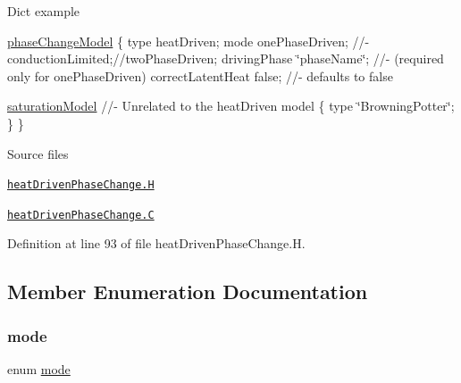 Dict example

\hyperlink{classFoam_1_1phaseChangeModel}{phase\+Change\+Model} \{ type heat\+Driven; mode one\+Phase\+Driven; //-\/ conduction\+Limited;//two\+Phase\+Driven; driving\+Phase \char`\"{}phase\+Name\char`\"{}; //-\/ (required only for one\+Phase\+Driven) correct\+Latent\+Heat false; //-\/ defaults to false

\hyperlink{classFoam_1_1saturationModel}{saturation\+Model} //-\/ Unrelated to the heat\+Driven model \{ type \char`\"{}\+Browning\+Potter\char`\"{}; \} \}

\begin{DoxyParagraph}{Source files}

\begin{DoxyItemize}
\item \href{../../../home/carlo/data/GeN-Foam/GeN-Foam_ffn/GeN-Foam/GeN-Foam/classes/thermalHydraulics/src/physicsModels/phaseChangeModels/heatDriven/heatDrivenPhaseChange.H}{\tt heat\+Driven\+Phase\+Change.\+H} 
\item \href{../../../home/carlo/data/GeN-Foam/GeN-Foam_ffn/GeN-Foam/GeN-Foam/classes/thermalHydraulics/src/physicsModels/phaseChangeModels/heatDriven/heatDrivenPhaseChange.C}{\tt heat\+Driven\+Phase\+Change.\+C} 
\end{DoxyItemize}
\end{DoxyParagraph}


Definition at line 93 of file heat\+Driven\+Phase\+Change.\+H.



\subsection{Member Enumeration Documentation}
\mbox{\label{classFoam_1_1phaseChangeModels_1_1heatDrivenPhaseChange_a1a6b6fb557d8d37d59700faf4e4c9167}} 
\subsubsection{\texorpdfstring{mode}{mode}}
{\footnotesize\ttfamily enum \hyperlink{classFoam_1_1phaseChangeModels_1_1heatDrivenPhaseChange_a1a6b6fb557d8d37d59700faf4e4c9167}{mode}}

